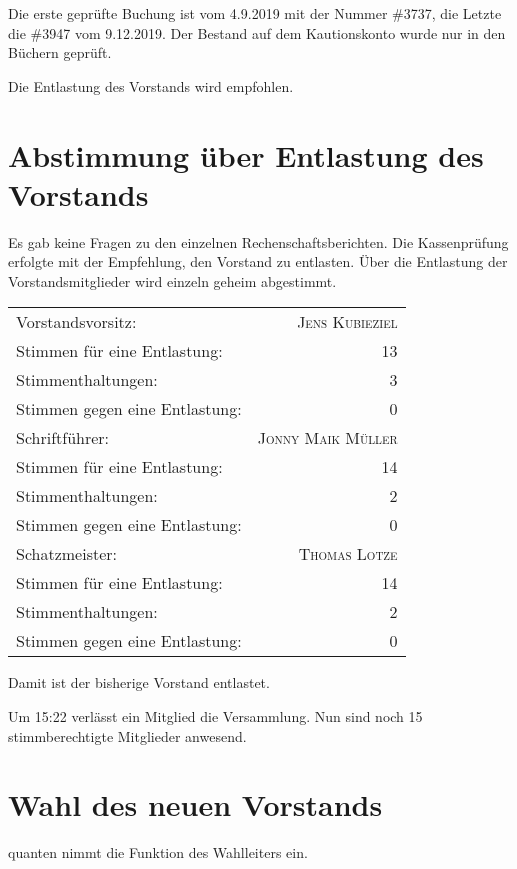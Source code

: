 \documentclass[DIV=calc,parksip=half*]{scrartcl}
\newcommand{\qbi}{Jens Kubieziel}
\newcommand{\jonny}{Jonny Maik Müller}
\newcommand{\thomas}{Thomas Lotze}
\newcommand{\quanten}{quanten}
\begin{document}
Die erste geprüfte Buchung ist vom 4.9.2019 mit der Nummer \#3737,
die Letzte die \#3947 vom 9.12.2019.
Der Bestand auf dem Kautionskonto wurde nur in den Büchern geprüft.

Die Entlastung des Vorstands wird empfohlen.

\section{Abstimmung über Entlastung des Vorstands}

Es gab keine Fragen zu den einzelnen Rechenschaftsberichten.
Die Kassenprüfung erfolgte mit der Empfehlung, den Vorstand zu entlasten.
Über die Entlastung der Vorstandsmitglieder wird einzeln geheim abgestimmt.

  \begin{tabularx}{.9\linewidth}{Xr}
    \toprule
    Vorstandsvorsitz: & \textsc{\qbi{}}\\
    Stimmen für eine Entlastung: & 13 \\
    Stimmenthaltungen: & 3 \\
    Stimmen gegen eine Entlastung: & 0\\
    \midrule
    Schriftführer: & \textsc{\jonny{}}\\
    Stimmen für eine Entlastung: & 14 \\
    Stimmenthaltungen: & 2 \\
    Stimmen gegen eine Entlastung: & 0\\
    \midrule
    Schatzmeister: & \textsc{\thomas{}}\\
    Stimmen für eine Entlastung: & 14 \\
    Stimmenthaltungen: & 2 \\
    Stimmen gegen eine Entlastung: & 0\\
    \bottomrule
\end{tabularx}

Damit ist der bisherige Vorstand entlastet.

Um 15:22 verlässt ein Mitglied die Versammlung. Nun sind noch 15 stimmberechtigte Mitglieder anwesend.

\section{Wahl des neuen Vorstands}

\quanten{} nimmt die Funktion des Wahlleiters ein.
\end{document}
